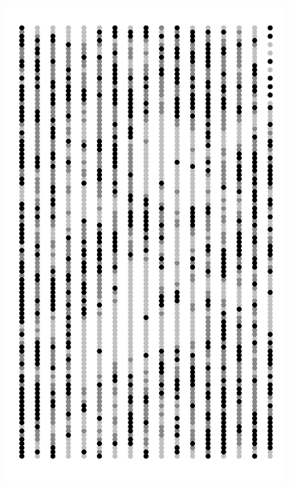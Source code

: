 \documentclass{uwstat572}
\begin{document}
\begin{figure}[!b]
\begin{subfigure}[b]{0.24\textwidth}
		\includegraphics[width=\textwidth]{figures/figure_5c.png}
		\caption{}
		\label{fig:week_50}
	\end{subfigure}
	\hfill
	\begin{subfigure}[b]{0.24\textwidth}

\end{subfigure}
\end{figure}
\end{document}

